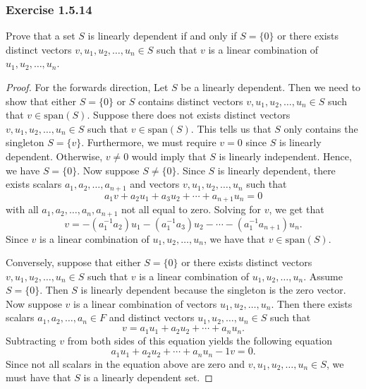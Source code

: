 \subsubsection{Exercise 1.5.14} Prove that a set \( S  \) is linearly dependent if and only if \( S = \{ 0  \}  \) or there exists distinct vectors \( v , u_{1}, u_{2}, \dots, u_{n} \in S  \) such that \( v  \) is a linear combination of \( u_{1}, u_{2}, \dots, u_{n} \).

\begin{proof}
    For the forwards direction, Let \( S  \) be a linearly dependent. Then we need to show that either \( S = \{ 0  \}  \) or \( S  \) contains distinct vectors \( v , u_{1}, u_{2} , \dots, u_{n} \in S  \) such that \( v \in \text{span}(S ) \). Suppose there does not exists distinct vectors  \( v , u_{1}, u_{2}, \dots, u_{n} \in  S  \) such that \( v \in \text{span}(S ) \). This tells us that \( S  \) only contains the singleton \( S = \{ v  \}  \). Furthermore, we must require \( v = 0  \) since \( S  \) is linearly dependent. Otherwise, \( v \neq 0  \) would imply that \( S  \) is linearly independent. Hence, we have \( S = \{ 0 \}  \).  
    Now suppose \( S \neq \{ 0 \}  \). Since \( S  \) is linearly dependent, there exists scalars \( a_{1}, a_{2}, \dots, a_{n+1} \)  and vectors \( v , u_{1}, u_{2}, \dots, u_{n}     \) such that 
    \[  a_{1} v +  a_{2} u_{1} + a_{3} u_{2} + \cdots + a_{n+1} u_{n} = 0   \] with all \( a_{1} , a_{2}, \dots , a_{n},  a_{n+1} \) not all equal to zero. Solving for \( v  \), we get that
    \[  v = -(a^{-1}_{1} a_{2} ) u_{1} - (a^{-1}_{1} a_{3}) u_{2} - \cdots - (a^{-1}_{1} a_{n+1}) u_{n}. \] 
    Since \( v  \) is a linear combination of \( u_{1}, u_{2}, \dots, u_{n}  \), we have that \( v \in \text{span}(S) \).

    Conversely, suppose that either \( S = \{ 0  \}  \) or there exists distinct vectors \( v , u_{1}, u_{2}, \dots, u_{n} \in S  \) such that \( v  \) is a linear combination of \( u_{1}, u_{2}, \dots, u_{n}   \). Assume \( S = \{ 0 \}  \). Then \( S  \) is linearly dependent because the singleton is the zero vector. Now suppose \( v  \) is a linear combination of vectors \( u_{1}, u_{2}, \dots, u_{n}  \). Then there exists scalars  \( a_{1}, a_{2}, \dots, a_{n} \in F  \) and distinct vectors \( u_{1}, u_{2}, \dots, u_{n} \in S  \) such that
    \[  v = a_{1} u_{1} + a_{2} u_{2} + \cdots + a_{n} u_{n}. \]
    Subtracting \( v  \) from both sides of this equation yields the following equation 
    \[  a_{1} u_{1} + a_{2} u_{2} + \cdots + a_{n} u_{n} - 1 v = 0.  \]
    Since not all scalars in the equation above are zero and \( v  , u_{1}, u_{2}, \dots, u_{n} \in S  \), we must have that \( S  \) is a linearly dependent set.
\end{proof}


